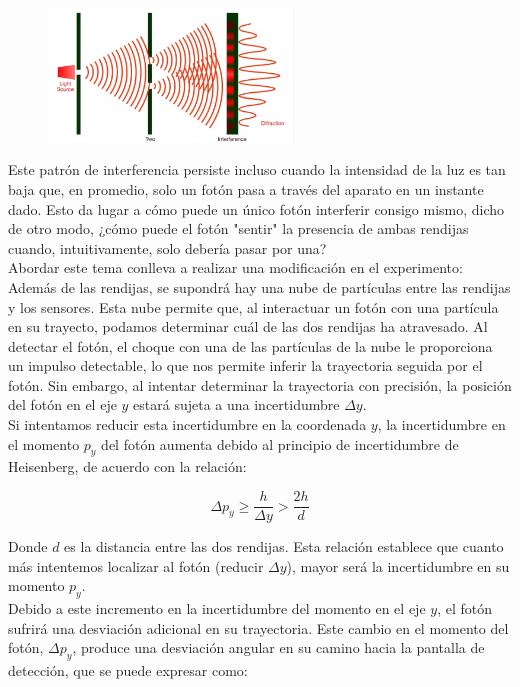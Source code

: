 \documentclass[a4paper]{article}
\begin{document}
    \begin{figure}[h!]
        \centering
        \includegraphics[width = 6.5cm]{../expDOPColor.png}
    \end{figure}

    \indent Este patrón de interferencia persiste incluso cuando la intensidad de la luz es tan baja que, en promedio, solo un fotón pasa a través del aparato en un instante dado. Esto da lugar a cómo puede un único fotón interferir consigo mismo, dicho de otro modo, ¿cómo puede el fotón "sentir" la presencia de ambas rendijas cuando, intuitivamente, solo debería pasar por una? \\

    \indent Abordar este tema conlleva a realizar una modificación en el experimento: Además de las rendijas, se supondrá hay una nube de partículas entre las rendijas y los sensores. Esta nube permite que, al interactuar un fotón con una partícula en su trayecto, podamos determinar cuál de las dos rendijas ha atravesado. Al detectar el fotón, el choque con una de las partículas de la nube le proporciona un impulso detectable, lo que nos permite inferir la trayectoria seguida por el fotón. Sin embargo, al intentar determinar la trayectoria con precisión, la posición del fotón en el eje $y$ estará sujeta a una incertidumbre $\Delta y$.\\

    \indent Si intentamos reducir esta incertidumbre en la coordenada $y$, la incertidumbre en el momento $p_y$ del fotón aumenta debido al principio de incertidumbre de Heisenberg, de acuerdo con la relación:

    \begin{equation}
        \Delta p_y \geq \frac{h}{\Delta y} > \frac{2h}{d}
    \end{equation}

    \indent Donde $d$ es la distancia entre las dos rendijas. Esta relación establece que cuanto más intentemos localizar al fotón (reducir $\Delta y$), mayor será la incertidumbre en su momento $p_y$. \\

    \indent Debido a este incremento en la incertidumbre del momento en el eje $y$, el fotón sufrirá una desviación adicional en su trayectoria. Este cambio en el momento del fotón, $\Delta p_y$, produce una desviación angular en su camino hacia la pantalla de detección, que se puede expresar como:
\end{document}
